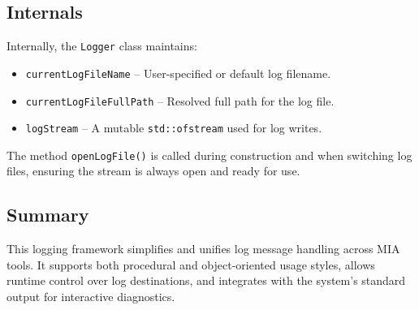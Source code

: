 \subsection{Internals}
Internally, the \texttt{Logger} class maintains:

\begin{itemize}
	\item \texttt{currentLogFileName} -- User-specified or default log filename.
	\item \texttt{currentLogFileFullPath} -- Resolved full path for the log file.
	\item \texttt{logStream} -- A mutable \texttt{std::ofstream} used for log writes.
\end{itemize}

The method \texttt{openLogFile()} is called during construction and when switching log files, ensuring the stream is always open and ready for use.

\subsection{Summary}
This logging framework simplifies and unifies log message handling across MIA tools. It supports both procedural and object-oriented usage styles, allows runtime control over log destinations, and integrates with the system's standard output for interactive diagnostics.





